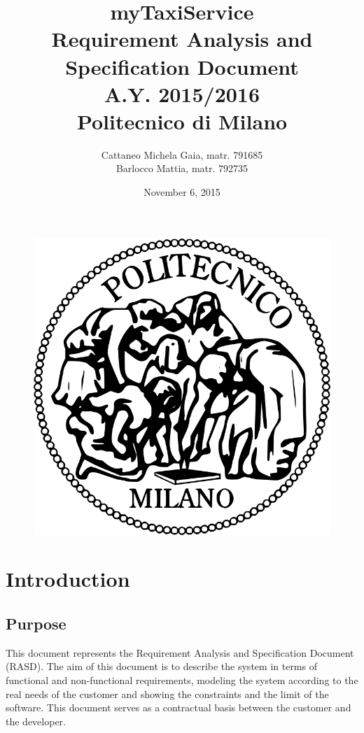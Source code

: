 \documentclass[18pt,oneside,a4paper, titlepage]{article}
\begin{document}
\begin{figure}[t]
	\centering
	\includegraphics[scale=0.35]{logo-polimi.png}
\end{figure}
\title{\textbf{myTaxiService}\\\textbf{R}equirement \textbf{A}nalysis and \textbf{S}pecification \textbf{D}ocument\\ A.Y. 2015/2016\\
	Politecnico di Milano}	
\author{Cattaneo Michela Gaia, matr. 791685\\Barlocco Mattia, matr. 792735 }
\date{November 6, 2015}
\maketitle

\newpage
\tableofcontents

\newpage
\section{Introduction}
	
	\subsection{Purpose}
		This document represents the Requirement Analysis and Specification Document (RASD). The aim of this document is to describe the system in terms of functional and non-functional requirements, modeling the system according to the real needs of the customer and showing the constraints and the limit of the software. This document serves as a contractual basis between the customer and the developer.
	
\end{document}
